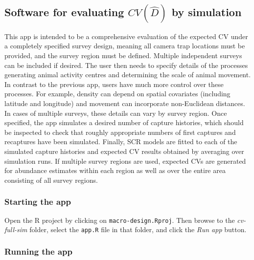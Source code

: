 \documentclass[a4paper,11pt]{article} %
\begin{document}
\subsection{Software for evaluating $CV(\hat{D})$ by simulation}
This app is intended to be a comprehensive evaluation of the expected CV under a completely specified survey design, meaning all camera trap locations must be provided, and the survey region must be defined. Multiple independent surveys can be included if desired. The user then needs to specify details of the processes generating animal activity centres and determining the scale of animal movement. In contrast to the previous app, users have much more control over these processes. For example, density can depend on spatial covariates (including latitude and longitude) and movement can incorporate non-Euclidean distances. In cases of multiple surveys, these details can vary by survey region. Once specified, the app simulates a desired number of capture histories, which should be inspected to check that roughly appropriate numbers of first captures and recaptures have been simulated. Finally, SCR models are fitted to each of the simulated capture histories and expected CV results obtained by averaging over simulation runs. If multiple survey regions are used, expected CVs are generated for abundance estimates within each region as well as over the entire area consisting of all survey regions.

\subsubsection{Starting the app}
Open the R project by clicking on \texttt{macro-design.Rproj}. Then browse to the \textit{cv-full-sim} folder, select the \texttt{app.R} file in that folder, and click the \textit{Run app} button. 

\subsubsection{Running the app}
\end{document}
